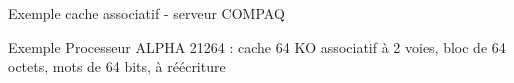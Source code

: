 %
\begin{Frame}{Exemple cache associatif - serveur COMPAQ}

      \begin{block}{Exemple Processeur ALPHA 21264 : cache 64 KO associatif à 2 voies, bloc de 64 octets, mots de 64 bits, à réécriture}
      \end{block}   

\vspace{-0.85cm}
        \begin{center}
        \end{center}
      
\end{Frame}


